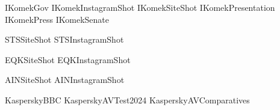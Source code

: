 \renewcommand\ExhibitGroup{CompanyInfo}

{IKomekGov}
{IKomekInstagramShot}
{IKomekSiteShot}
{IKomekPresentation}
{IKomekPress}
{IKomekSenate}

{STSSiteShot}
{STSInstagramShot}

{EQKSiteShot}
{EQKInstagramShot}

{AINSiteShot}
{AINInstagramShot}

{KasperskyBBC}
{KasperskyAVTest2024}
{KasperskyAVComparatives}
